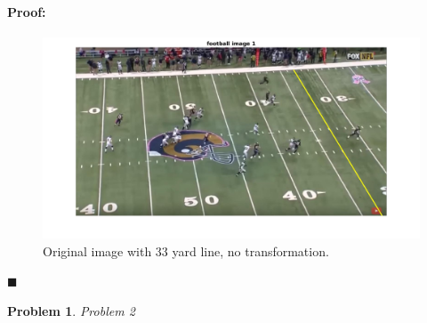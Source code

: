 \documentclass[12pt]{article}
\newenvironment{proof}{\paragraph{Proof: }}{\hfill$\blacksquare$}
\newtheorem{problem}{Problem}%
\begin{document}
\begin{proof}
\begin{enumerate}
\begin{figure}[h]
\begin{center}
\centering
\includegraphics[scale=0.3]{problem1_orig_im.jpg}
\caption{Original image with 33 yard line, no transformation.}
\label{fig:mesh1}
\end{center}
\end{figure}

\end{enumerate}
\end{proof}

\pagebreak

\begin{problem}

Problem 2

\end{problem}
\end{document}
